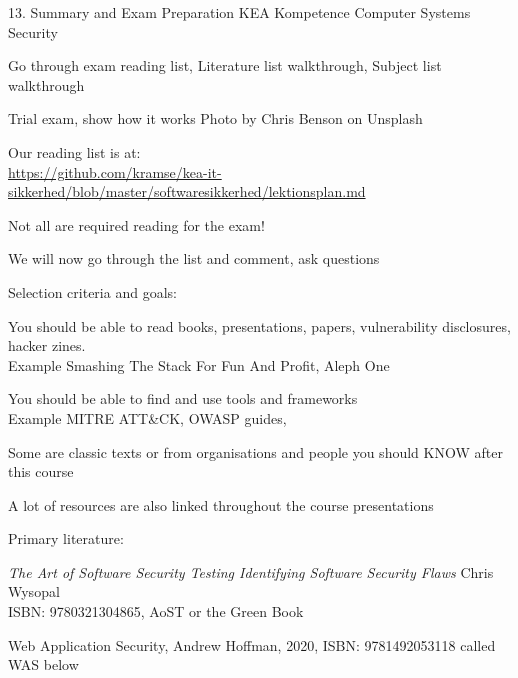 \documentclass[Screen16to9,17pt]{foils}
\begin{document}
\mytitlepage
{13. Summary and Exam Preparation}
{KEA Kompetence Computer Systems Security}





\begin{list1}
\item Go through exam reading list, Literature list walkthrough, Subject list walkthrough
\item Trial exam, show how it works \hfill {\small Photo by Chris Benson on Unsplash}

\end{list1}




\begin{list1}
\item Our reading list is at:\\
{\small\url{https://github.com/kramse/kea-it-sikkerhed/blob/master/softwaresikkerhed/lektionsplan.md}}
\item Not all are required reading for the exam!
\item We will now go through the list and comment, ask questions
\item Selection criteria and goals:
\begin{list2}
\item You should be able to read books, presentations, papers, vulnerability disclosures, hacker zines. \\
Example Smashing The Stack For Fun And Profit, Aleph One
\item You should be able to find and use tools and frameworks\\
Example MITRE ATT\&CK, OWASP guides,
\end{list2}
\item Some are classic texts or from organisations and people you should KNOW after this course
\item A lot of resources are also linked throughout the course presentations
\end{list1}





Primary literature:
\begin{list2}
\item \emph{The Art of Software Security Testing Identifying Software Security Flaws}
Chris Wysopal\\
ISBN: 9780321304865, AoST or the Green Book
\item Web Application Security, Andrew Hoffman, 2020, ISBN: 9781492053118 called WAS below
\end{list2}
\end{document}
